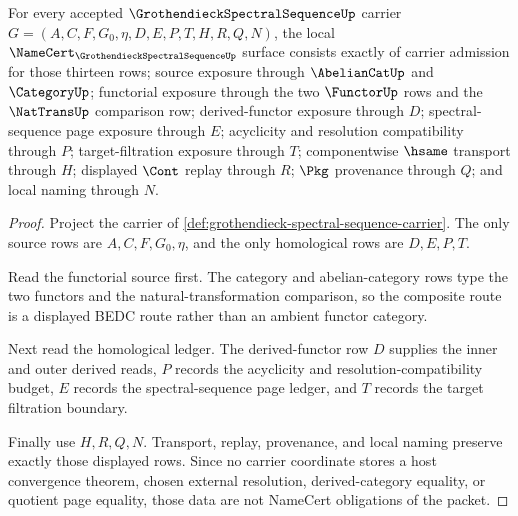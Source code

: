 \begin{theorem}
\label{thm:grothendieck-spectral-sequence-namecert-obligations}
For every accepted $\GrothendieckSpectralSequenceUp$ carrier $G=(A,C,F,G_0,\eta,D,E,P,T,H,R,Q,N)$, the local $\NameCert_{\GrothendieckSpectralSequenceUp}$ surface consists exactly of carrier admission for those thirteen rows; source exposure through $\AbelianCatUp$ and $\CategoryUp$; functorial exposure through the two $\FunctorUp$ rows and the $\NatTransUp$ comparison row; derived-functor exposure through $D$; spectral-sequence page exposure through $E$; acyclicity and resolution compatibility through $P$; target-filtration exposure through $T$; componentwise $\hsame$ transport through $H$; displayed $\Cont$ replay through $R$; $\Pkg$ provenance through $Q$; and local naming through $N$.
\end{theorem}
\begin{proof}
Project the carrier of \autoref{def:grothendieck-spectral-sequence-carrier}. The only source rows are $A,C,F,G_0,\eta$, and the only homological rows are $D,E,P,T$.

Read the functorial source first. The category and abelian-category rows type the two functors and the natural-transformation comparison, so the composite route is a displayed BEDC route rather than an ambient functor category.

Next read the homological ledger. The derived-functor row $D$ supplies the inner and outer derived reads, $P$ records the acyclicity and resolution-compatibility budget, $E$ records the spectral-sequence page ledger, and $T$ records the target filtration boundary.

Finally use $H,R,Q,N$. Transport, replay, provenance, and local naming preserve exactly those displayed rows. Since no carrier coordinate stores a host convergence theorem, chosen external resolution, derived-category equality, or quotient page equality, those data are not NameCert obligations of the packet.
\end{proof}

